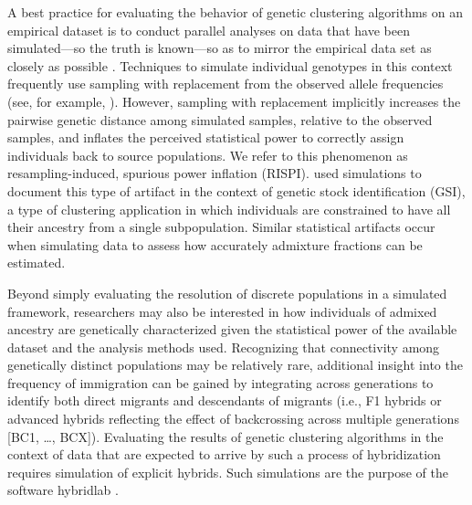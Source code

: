 A best practice for evaluating the behavior of genetic clustering algorithms on an empirical dataset is to conduct
parallel analyses on data that have been simulated---so the truth is known---so as to mirror the empirical data set
as closely as possible \citep{vaha2006efficiency,anderson2008improved,latch2011fine}.
Techniques to simulate individual genotypes in this context frequently use sampling with replacement from the
observed allele frequencies (see, for example, \citealt{nielsen2006hybridlab,kinziger2008hybridization}).
However, sampling with replacement implicitly increases the pairwise genetic distance among simulated samples, relative to the observed
samples, and
inflates the perceived statistical power to correctly assign individuals back to source populations.
We refer to this phenomenon as resampling-induced, spurious power inflation (RISPI).
\citet{anderson2008improved} used simulations to document this type of artifact in the context of
genetic stock identification (GSI), a type of clustering application in which individuals are constrained to have
all their ancestry from a single subpopulation.
Similar statistical artifacts occur when simulating data to
assess how accurately admixture fractions can be estimated.


Beyond simply evaluating the resolution of discrete populations in a simulated framework, researchers may also be
interested in how individuals of admixed ancestry are genetically characterized given the statistical power of the available dataset and the
analysis methods used.
Recognizing that connectivity among genetically distinct populations may be relatively rare, additional insight into the
frequency of immigration can be gained by integrating across generations to identify both direct migrants and descendants of migrants
 (i.e., F1 hybrids or advanced hybrids reflecting the effect of backcrossing across multiple generations [BC1, \ldots,
BCX]).
Evaluating the results of genetic clustering algorithms in the context of data that are
expected to arrive by such a process of hybridization requires simulation of
explicit hybrids.  Such simulations are the purpose of the software {\sc hybridlab} 
\citep{nielsen2006hybridlab}.

